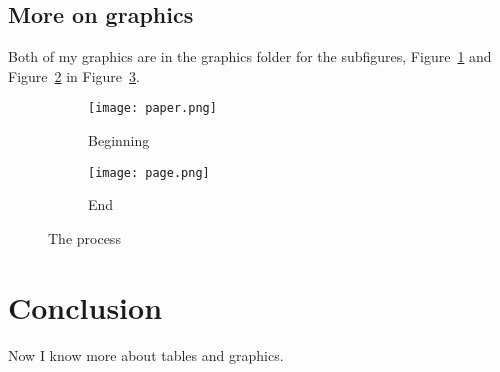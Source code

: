 \documentclass{proc}
\begin{document}
\subsection{More on graphics}

Both of my graphics are in the graphics folder for the subfigures, Figure~\ref{fig:paper} and Figure~\ref{fig:page} in Figure~\ref{fig:subs}.

\begin{figure}[htbp]
\centering
\begin{subfigure}[b]{0.2\textwidth}
	\centering
	\texttt{[image: paper.png]}
	\caption{Beginning}
	\label{fig:paper}
\end{subfigure}%
\begin{subfigure}[b]{0.2\textwidth}
	\centering
	\texttt{[image: page.png]}
	\caption{End}
	\label{fig:page}
\end{subfigure}%
\caption{The process}
\label{fig:subs}
\end{figure}

\section{Conclusion}

Now I know more about tables and graphics.
\end{document}
